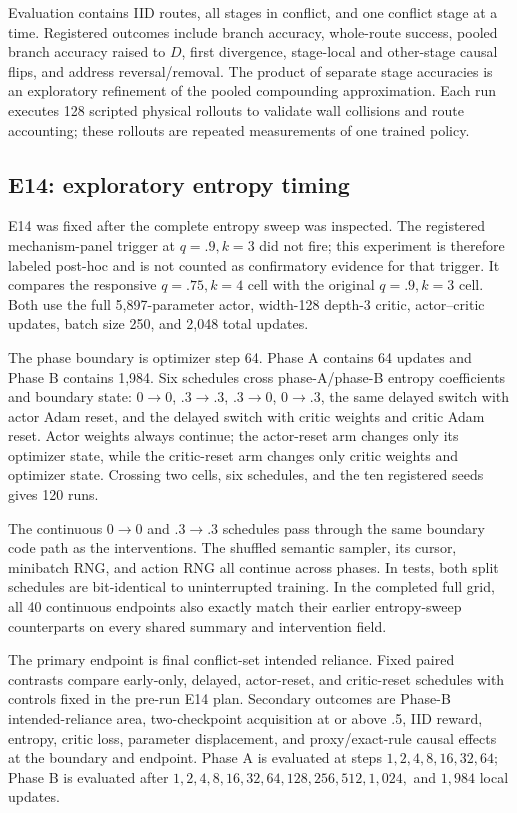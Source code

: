\documentclass[11pt,a4paper]{article}
\begin{document}
Evaluation contains IID routes, all stages in conflict, and one conflict stage at a time. Registered outcomes include branch accuracy, whole-route success, pooled branch accuracy raised to $D$, first divergence, stage-local and other-stage causal flips, and address reversal/removal. The product of separate stage accuracies is an exploratory refinement of the pooled compounding approximation. Each run executes 128 scripted physical rollouts to validate wall collisions and route accounting; these rollouts are repeated measurements of one trained policy.

\subsection{E14: exploratory entropy timing}

E14 was fixed after the complete entropy sweep was inspected. The registered mechanism-panel trigger at $q=.9,k=3$ did not fire; this experiment is therefore labeled post-hoc and is not counted as confirmatory evidence for that trigger. It compares the responsive $q=.75,k=4$ cell with the original $q=.9,k=3$ cell. Both use the full 5,897-parameter actor, width-128 depth-3 critic, actor--critic updates, batch size 250, and 2,048 total updates.

The phase boundary is optimizer step 64. Phase A contains 64 updates and Phase B contains 1,984. Six schedules cross phase-A/phase-B entropy coefficients and boundary state: $0\mathbin{\to}0$, $.3\mathbin{\to}.3$, $.3\mathbin{\to}0$, $0\mathbin{\to}.3$, the same delayed switch with actor Adam reset, and the delayed switch with critic weights and critic Adam reset. Actor weights always continue; the actor-reset arm changes only its optimizer state, while the critic-reset arm changes only critic weights and optimizer state. Crossing two cells, six schedules, and the ten registered seeds gives 120 runs.

The continuous $0\mathbin{\to}0$ and $.3\mathbin{\to}.3$ schedules pass through the same boundary code path as the interventions. The shuffled semantic sampler, its cursor, minibatch RNG, and action RNG all continue across phases. In tests, both split schedules are bit-identical to uninterrupted training. In the completed full grid, all 40 continuous endpoints also exactly match their earlier entropy-sweep counterparts on every shared summary and intervention field.

The primary endpoint is final conflict-set intended reliance. Fixed paired contrasts compare early-only, delayed, actor-reset, and critic-reset schedules with controls fixed in the pre-run E14 plan. Secondary outcomes are Phase-B intended-reliance area, two-checkpoint acquisition at or above .5, IID reward, entropy, critic loss, parameter displacement, and proxy/exact-rule causal effects at the boundary and endpoint. Phase A is evaluated at steps $1,2,4,8,16,32,64$; Phase B is evaluated after $1,2,4,8,16,32,64,128,256,512,1{,}024,$ and $1{,}984$ local updates.
\end{document}

